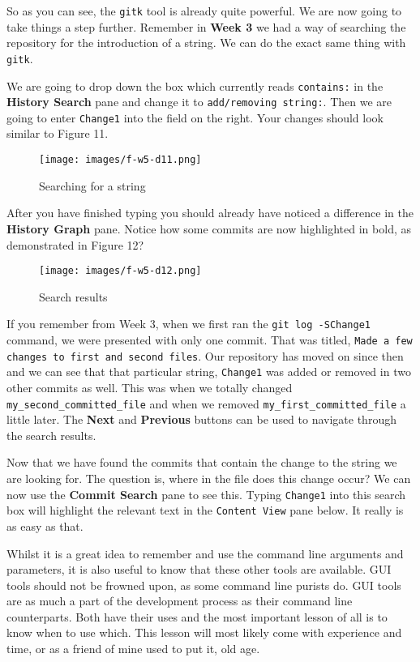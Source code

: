 So as you can see, the \texttt{gitk} tool is already quite powerful.  We are now going to take things a step further.  Remember in \textbf{Week 3} we had a way of searching the repository for the introduction of a string.  We can do the exact same thing with \texttt{gitk}.  

We are going to drop down the box which currently reads \texttt{contains:} in the \textbf{History Search} pane and change it to \texttt{add/removing string:}.  Then we are going to enter \texttt{Change1} into the field on the right.  Your changes should look similar to Figure 11.

\begin{figure}[hbt]
\centering
\texttt{[image: images/f-w5-d11.png]}
\caption{Searching for a string}
\end{figure} 

After you have finished typing you should already have noticed a difference in the \textbf{History Graph} pane.  Notice how some commits are now highlighted in bold, as demonstrated in Figure 12?

\begin{figure}[hbt]
\centering
\texttt{[image: images/f-w5-d12.png]}
\caption{Search results}
\end{figure} 

If you remember from Week 3, when we first ran the \texttt{git log -SChange1} command, we were presented with only one commit.  That was titled, \texttt{Made a few changes to first and second files}.  Our repository has moved on since then and we can see that that particular string, \texttt{Change1} was added or removed in two other commits as well.  This was when we totally changed \texttt{my\_second\_committed\_file} and when we removed \texttt{my\_first\_committed\_file} a little later.  The \textbf{Next} and \textbf{Previous} buttons can be used to navigate through the search results.

Now that we have found the commits that contain the change to the string we are looking for.  The question is, where in the file does this change occur?  We can now use the \textbf{Commit Search} pane to see this.  Typing \texttt{Change1} into this search box will highlight the relevant text in the \texttt{Content View} pane below.  It really is as easy as that.

Whilst it is a great idea to remember and use the command line arguments and parameters, it is also useful to know that these other tools are available.  GUI tools should not be frowned upon, as some command line purists do.  GUI tools are as much a part of the development process as their command line counterparts.  Both have their uses and the most important lesson of all is to know when to use which.  This lesson will most likely come with experience and time, or as a friend of mine used to put it, old age.

